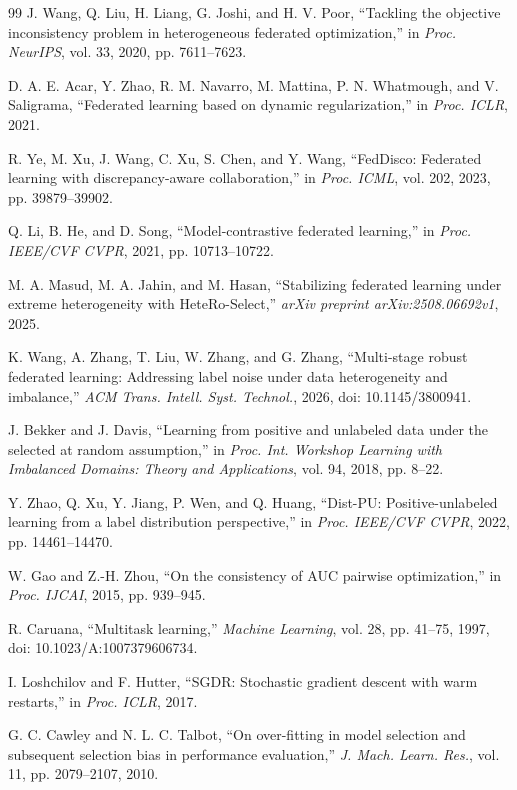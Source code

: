 \documentclass[lettersize,journal]{IEEEtran}
\begin{document}
\begin{thebibliography}{99}
J. Wang, Q. Liu, H. Liang, G. Joshi, and H. V. Poor, ``Tackling the objective inconsistency problem in heterogeneous federated optimization,'' in \emph{Proc. NeurIPS}, vol. 33, 2020, pp. 7611--7623.

D. A. E. Acar, Y. Zhao, R. M. Navarro, M. Mattina, P. N. Whatmough, and V. Saligrama, ``Federated learning based on dynamic regularization,'' in \emph{Proc. ICLR}, 2021.

R. Ye, M. Xu, J. Wang, C. Xu, S. Chen, and Y. Wang, ``FedDisco: Federated learning with discrepancy-aware collaboration,'' in \emph{Proc. ICML}, vol. 202, 2023, pp. 39879--39902.

Q. Li, B. He, and D. Song, ``Model-contrastive federated learning,'' in \emph{Proc. IEEE/CVF CVPR}, 2021, pp. 10713--10722.

M. A. Masud, M. A. Jahin, and M. Hasan, ``Stabilizing federated learning under extreme heterogeneity with HeteRo-Select,'' \emph{arXiv preprint arXiv:2508.06692v1}, 2025.

K. Wang, A. Zhang, T. Liu, W. Zhang, and G. Zhang, ``Multi-stage robust federated learning: Addressing label noise under data heterogeneity and imbalance,'' \emph{ACM Trans. Intell. Syst. Technol.}, 2026, doi: 10.1145/3800941.

J. Bekker and J. Davis, ``Learning from positive and unlabeled data under the selected at random assumption,'' in \emph{Proc. Int. Workshop Learning with Imbalanced Domains: Theory and Applications}, vol. 94, 2018, pp. 8--22.

Y. Zhao, Q. Xu, Y. Jiang, P. Wen, and Q. Huang, ``Dist-PU: Positive-unlabeled learning from a label distribution perspective,'' in \emph{Proc. IEEE/CVF CVPR}, 2022, pp. 14461--14470.

W. Gao and Z.-H. Zhou, ``On the consistency of AUC pairwise optimization,'' in \emph{Proc. IJCAI}, 2015, pp. 939--945.

R. Caruana, ``Multitask learning,'' \emph{Machine Learning}, vol. 28, pp. 41--75, 1997, doi: 10.1023/A:1007379606734.

I. Loshchilov and F. Hutter, ``SGDR: Stochastic gradient descent with warm restarts,'' in \emph{Proc. ICLR}, 2017.

G. C. Cawley and N. L. C. Talbot, ``On over-fitting in model selection and subsequent selection bias in performance evaluation,'' \emph{J. Mach. Learn. Res.}, vol. 11, pp. 2079--2107, 2010.


\end{thebibliography}
\end{document}
